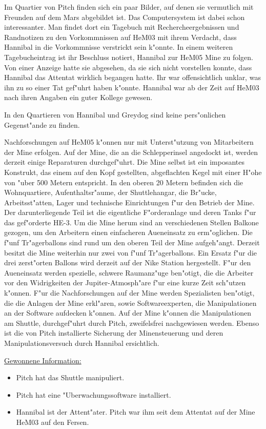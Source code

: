 Im Quartier von Pitch finden sich ein paar Bilder, auf denen sie vermutlich mit Freunden auf dem Mars abgebildet ist. Das Computersystem ist dabei schon interessanter. Man findet dort ein Tagebuch mit Rechercheergebnissen und Randnotizen zu den Vorkommnissen auf HeM03 mit ihrem Verdacht, dass Hannibal in die Vorkommnisse verstrickt sein k"onnte. In einem weiteren Tagebucheintrag ist ihr Beschluss notiert, Hannibal zur HeM05 Mine zu folgen. Von einer Anzeige hatte sie abgesehen, da sie sich nicht vorstellen konnte, dass Hannibal das Attentat wirklich begangen hatte. Ihr war offensichtlich unklar, was ihn zu so einer Tat gef"uhrt haben k"onnte. Hannibal war ab der Zeit auf HeM03 nach ihren Angaben ein guter Kollege gewesen.

In den Quartieren von Hannibal und Greydog sind keine pers"onlichen Gegenst"ande zu finden.

Nachforschungen auf HeM05 k"onnen nur mit Unterst"utzung von Mitarbeitern der Mine erfolgen. Auf der Mine, die an die Schlepperinsel angedockt ist, werden derzeit einige Reparaturen durchgef"uhrt. Die Mine selbst ist ein imposantes Konstrukt, das einem auf den Kopf gestellten, abgeflachten Kegel mit einer H"ohe von "uber 500 Metern entspricht. In den oberen 20 Metern befinden sich die Wohnquartiere, Aufenthaltsr"aume, der Shuttlehangar, die Br"ucke, Arbeitsst"atten, Lager und technische Einrichtungen f"ur den Betrieb der Mine. Der darunterliegende Teil ist die eigentliche F"orderanlage und deren Tanks f"ur das gef"orderte HE-3. Um die Mine herum sind an verschiedenen Stellen Balkone gezogen, um den Arbeitern einen einfacheren Au\3eneinsatz zu erm"oglichen. Die f"unf Tr"agerballons sind rund um den oberen Teil der Mine aufgeh"angt. Derzeit besitzt die Mine weiterhin nur zwei von f"unf Tr"agerballons. Ein Ersatz f"ur die drei zerst"orten Ballons wird derzeit auf der Nike Station hergestellt. F"ur den Au\3eneinsatz werden spezielle, schwere Raumanz"uge ben"otigt, die die Arbeiter vor den Widrigkeiten der Jupiter-Atmosph"are f"ur eine kurze Zeit sch"utzen k"onnen. F"ur die Nachforschungen auf der Mine werden Spezialisten ben"otigt, die die Anlagen der Mine erkl"aren, sowie Softwareexperten, die Manipulationen an der Software aufdecken k"onnen. Auf der Mine k"onnen die Manipulationen am Shuttle, durchgef"uhrt durch Pitch, zweifelsfrei nachgewiesen werden. Ebenso ist die von Pitch installierte Sicherung der Minensteuerung und deren Manipulationsversuch durch Hannibal ersichtlich.

\begin{remarks}
	\underline{Gewonnene Information:}

	\begin{itemize}
		\item Pitch hat das Shuttle manipuliert.
		\item Pitch hat eine "Uberwachungssoftware installiert.
		\item Hannibal ist der Attent"ater. Pitch war ihm seit dem Attentat auf der Mine HeM03 auf den Fersen.
	\end{itemize}
\end{remarks}
